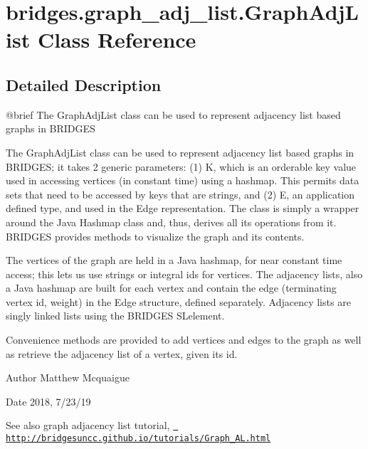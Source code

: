 \hypertarget{classbridges_1_1graph__adj__list_1_1_graph_adj_list}{}\section{bridges.\+graph\+\_\+adj\+\_\+list.\+Graph\+Adj\+List Class Reference}
\label{classbridges_1_1graph__adj__list_1_1_graph_adj_list}


\subsection{Detailed Description}
\begin{DoxyVerb}@brief The GraphAdjList class can be used to represent adjacency list based
    graphs in BRIDGES

The GraphAdjList class can be used to represent adjacency list based  graphs
in BRIDGES; it takes 2 generic parameters: (1) K, which is an orderable
key value used in accessing vertices (in constant time) using a hashmap. This
permits data sets that need to be accessed by keys that are strings, and
(2) E, an application defined type, and used in the Edge representation.
The class is simply a wrapper  around the Java Hashmap class
and, thus, derives all its operations from it.
BRIDGES provides methods to visualize the graph  and its contents.

The vertices of the graph are held in a Java hashmap, for near constant time access;
this lets us use strings or integral ids for vertices. The adjacency lists,
also a Java hashmap  are built for each vertex and contain the edge (terminating
vertex id, weight) in the Edge structure, defined separately. Adjacency lists
are singly linked lists using the BRIDGES SLelement.

Convenience methods are provided to add vertices and edges to the graph as well as
retrieve the adjacency list of a vertex, given its id.
\end{DoxyVerb}


\begin{DoxyAuthor}{Author}
Matthew Mcquaigue 
\end{DoxyAuthor}
\begin{DoxyDate}{Date}
2018, 7/23/19
\end{DoxyDate}
\begin{DoxySeeAlso}{See also}
graph adjacency list tutorial, \href{http://bridgesuncc.github.io/tutorials/Graph_AL.html}{\texttt{ http\+://bridgesuncc.\+github.\+io/tutorials/\+Graph\+\_\+\+A\+L.\+html}} 
\end{DoxySeeAlso}
